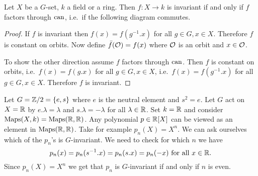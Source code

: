\begin{lem}
 Let $X$ be a $G$-set, $k$ a field or a ring. Then $f \colon X \to k$ is invariant if and only if $f$ factors through $\operatorname{can}$, i.e.\ if the following diagram commutes.
 \begin{center}
 \end{center}
\end{lem}
\begin{proof}
 If $f$ is invariant then $f(x) = f(g^{-1}.x)$ for all $g \in G, x \in X$. Therefore $f$ is constant on orbits. Now define $\bar{f}(\mathcal{O}) = f(x)$ where $\mathcal{O}$ is an orbit and $x \in \mathcal{O}$.
 
 To show the other direction assume $f$ factors through $\operatorname{can}$. Then $f$ is constant on orbits, i.e.\ $f(x) = f(g.x)$ for all $g \in G, x \in X$, i.e.\ $f(x) = f(g^{-1}.x)$ for all $g \in G, x \in X$. Therefore $f$ is invariant.
\end{proof}


\begin{expl}
 Let $G = \mathbb{Z}/2 = \{e,s\}$ where $e$ is the neutral element and $s^2 = e$. Let $G$ act on $X = \mathbb{R}$ by $e.\lambda = \lambda$ and $s.\lambda = -\lambda$ for all $\lambda \in \mathbb{R}$. Set $k = \mathbb{R}$ and consider $\operatorname{Maps}(X,k) = \operatorname{Maps}(\mathbb{R},\mathbb{R})$. Any polynomial $p \in \mathbb{R}[X]$ can be viewed as an element in $\operatorname{Maps}(\mathbb{R},\mathbb{R})$. Take for example $p_n(X) = X^n$. We can ask ourselves which of the $p_n$’s is $G$-invariant. We need to check for which $n$ we have
 \[
  p_n(x) = p_n(s^{-1}.x) = p_n(s.x) = p_n(-x) \text{ for all } x \in \mathbb{R}.
 \]
 Since $p_n(X) = X^n$ we get that $p_n$ is $G$-invariant if and only if $n$ is even.
\end{expl}



